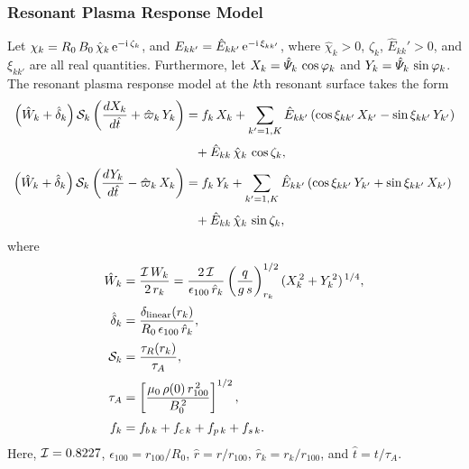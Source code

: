 \documentclass[12pt,prb,aps]{revtex4-1}
\begin{document}
\subsubsection{Resonant Plasma Response Model}\label{res}
Let ${\mit\chi}_k= R_0\,B_0\,\hat{\chi}_k\,{\rm e}^{-{\rm i}\,\zeta_k}$, and $E_{kk'}=\hat{E}_{kk'}\,{\rm e}^{-{\rm i}\,\xi_{kk'}}$,
where  $\hat{\chi}_k>0$, $\zeta_k$, $\hat{E}_{kk}'>0$, and $\xi_{kk'}$ are all real quantities. Furthermore,
let $X_k= \hat{\mit\Psi}_k\,\cos\varphi_k$ and $Y_k= \hat{\mit\Psi}_k\,\sin\varphi_k$. The resonant plasma response model at the 
$k$th resonant surface takes the form\,\cite{rftor,rftor2}
\begin{align}\label{e21}
\left(\hat{W}_k +\hat{\delta}_k\right){\cal S}_k\left(\frac{dX_k}{d\hat{t}} 
+\hat{\varpi}_k\,Y_k\right)&= f_k\,X_k+ \sum_{k'=1,K}\hat{E}_{kk'}\,(\cos\xi_{kk'}\,X_{k'}  -\sin\xi_{kk'}\,Y_{k'})\nonumber\\[0.5ex] &\phantom{=}+ \hat{E}_{kk}\,\hat{\chi}_k\,\cos\zeta_k,\\[0.5ex]
\left(\hat{W}_k +\hat{\delta}_k\right){\cal S}_k\left(\frac{dY_k}{d\hat{t}} -\hat{\varpi}_k\,X_k\right)
&= f_k\,Y_k + \sum_{k'=1,K}\hat{E}_{kk'}\,(\cos\xi_{kk'}\,Y_{k'}
+\sin\xi_{kk'}\,X_{k'}) \nonumber\\[0.5ex]
&\phantom{=}+ \hat{E}_{kk}\,\hat{\chi}_k\,\sin\zeta_k,\label{e22}
\end{align}
where
\begin{align}\label{e23}
\hat{W}_k &=\frac{{\cal I}\,W_k}{2\,r_k}=\frac{2\,{\cal I}}{\epsilon_{100}\,\hat{r}_k}\left(\frac{q}{g\,s}\right)^{1/2}_{r_k} (X_k^{\,2} + Y_k^{\,2})^{\,1/4},\\[0.5ex]
\hat{\delta}_k &= \frac{\delta_{\rm linear}(r_k)}{R_0\,\epsilon_{100}\,\hat{r}_k},\\[0.5ex]
{\cal S}_k&=\frac{\tau_R(r_k)}{\tau_A},\\[0.5ex]
\tau_A &= \left[\frac{\mu_0\,\rho(0)\,r_{100}^{\,2}}{B_0^{\,2}}\right]^{1/2},\\[0.5ex]
f_k &=f_{b\,k}+f_{c\,k} + f_{p\,k} + f_{s\,k}.\label{fdef}
\end{align}
Here, ${\cal I} = 0.8227$, $\epsilon_{100}=r_{100}/R_0$, $\hat{r}=r/r_{100}$, $\hat{r}_k=r_k/r_{100}$, and $\hat{t}=t/\tau_A$. 
\end{document}
